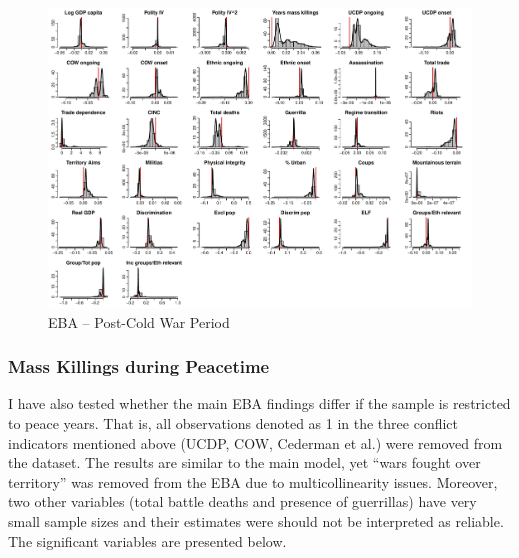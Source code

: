 \clearpage
\begin{figure}
    \centering
    \includegraphics[width=.9\textwidth]{images/mk-postcoldwar.pdf}
    \caption{EBA -- Post-Cold War Period}
    \label{fig:mk-postcoldwar}
\end{figure}
\clearpage

\subsubsection{Mass Killings during Peacetime}

I have also tested whether the main EBA findings differ if the sample is restricted to peace years. That is, all observations denoted as 1 in the three conflict indicators mentioned above (UCDP, COW, Cederman et al.) were removed from the dataset. The results are similar to the main model, yet ``wars fought over territory'' was removed from the EBA due to multicollinearity issues. Moreover, two other variables (total battle deaths and presence of guerrillas) have very small sample sizes and their estimates were should not be interpreted as reliable. The significant variables are presented below.

\vspace{1cm}

